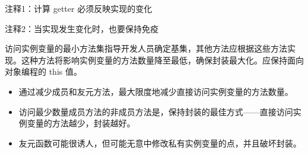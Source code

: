 {\footnotesize
注释1：计算 getter 必须反映实现的变化

注释2：当实现发生变化时，也要保持免疫
}

访问实例变量的最小方法集指导开发人员确定基集，其他方法应根据这些方法实现。这种方法将影响实例变量的方法数量降至最低，确保封装最大化。应保持面向对象编程的 this 值。


\begin{itemize}
\item
通过减少成员和友元方法，最大限度地减少直接访问实例变量的方法数量。

\item
访问最少数量成员方法的非成员方法是，保持封装的最佳方式——直接访问实例变量的方法越少，封装越好。

\item
友元函数可能很诱人，但可能无意中修改私有实例变量的点，并且破坏封装。
\end{itemize}













